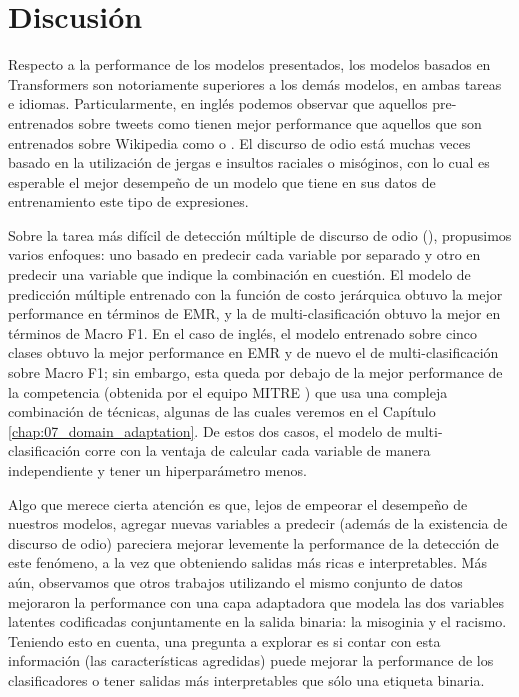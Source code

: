 \section{Discusión}
\label{sec:04_discussion}

Respecto a la performance de los modelos presentados, los modelos basados en Transformers son notoriamente superiores a los demás modelos, en ambas tareas e idiomas. Particularmente, en inglés podemos observar que aquellos pre-entrenados sobre tweets como \bertweet{} tienen mejor performance que aquellos que son entrenados sobre Wikipedia como \bert{} o \roberta{}. El discurso de odio está muchas veces basado en la utilización de jergas e insultos raciales o misóginos, con lo cual es esperable el mejor desempeño de un modelo que tiene en sus datos de entrenamiento este tipo de expresiones.

Sobre la tarea más difícil de detección múltiple de discurso de odio (\subtaskb{}), propusimos varios enfoques: uno basado en predecir cada variable por separado y otro en predecir una variable que indique la combinación en cuestión. El modelo de predicción múltiple entrenado con la función de costo jerárquica obtuvo la mejor performance en términos de EMR, y la de multi-clasificación obtuvo la mejor en términos de Macro F1. En el caso de inglés, el modelo entrenado sobre cinco clases obtuvo la mejor performance en EMR y de nuevo el de multi-clasificación sobre Macro F1; sin embargo, esta queda por debajo de la mejor performance de la competencia (obtenida por el equipo MITRE \cite{gertner-etal-2019-mitre}) que usa una compleja combinación de técnicas, algunas de las cuales veremos en el Capítulo \ref{chap:07_domain_adaptation}. De estos dos casos, el modelo de multi-clasificación corre con la ventaja de calcular cada variable de manera independiente y tener un hiperparámetro menos.

Algo que merece cierta atención es que, lejos de empeorar el desempeño de nuestros modelos, agregar nuevas variables a predecir (además de la existencia de discurso de odio) pareciera mejorar levemente la performance de la detección de este fenómeno, a la vez que obteniendo salidas más ricas e interpretables. Más aún, observamos que otros trabajos \cite{gertner-etal-2019-mitre} utilizando el mismo conjunto de datos mejoraron la performance con una capa adaptadora que modela las dos variables latentes codificadas conjuntamente en la salida binaria: la misoginia y el racismo. Teniendo esto en cuenta, una pregunta a explorar es si contar con esta información (las características agredidas) puede mejorar la performance de los clasificadores o tener salidas más interpretables que sólo una etiqueta binaria.

